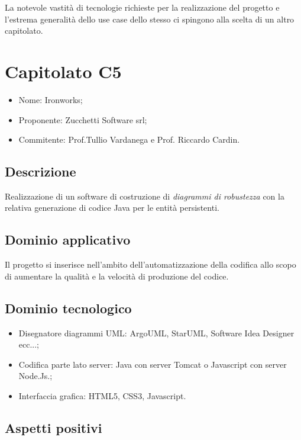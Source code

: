 \documentclass[openany,12pt,a4paper]{report}
\begin{document}
La notevole vastità di tecnologie richieste per la realizzazione del progetto e l'estrema generalità dello use case dello stesso ci spingono alla scelta di un altro capitolato.


\section{Capitolato C5}

\begin{itemize}
    \item{Nome:} Ironworks;
    \item{Proponente:} Zucchetti Software srl;
    \item{Commitente:} Prof.Tullio Vardanega e Prof. Riccardo Cardin.
\end{itemize}

\subsection{Descrizione}

Realizzazione di un software di costruzione di \textit{diagrammi di robustezza} con la relativa generazione di codice Java per le entità persistenti.

\subsection{Dominio applicativo}

Il progetto si inserisce nell'ambito dell'automatizzazione della codifica allo scopo di aumentare la qualità e la velocità di produzione del codice.

\subsection{Dominio tecnologico}

\begin{itemize}
    \item{Disegnatore diagrammi UML:} ArgoUML, StarUML, Software Idea Designer ecc...;
    
    \item{Codifica parte lato server:} Java con server Tomcat o Javascript con server Node.Js.;
    
    \item{Interfaccia grafica:} HTML5, CSS3, Javascript.
\end{itemize}

\subsection{Aspetti positivi}
\end{document}
